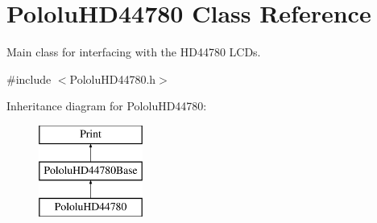 \hypertarget{class_pololu_h_d44780}{}\section{Pololu\+H\+D44780 Class Reference}
\label{class_pololu_h_d44780}


Main class for interfacing with the H\+D44780 L\+C\+Ds.  




{\ttfamily \#include $<$Pololu\+H\+D44780.\+h$>$}

Inheritance diagram for Pololu\+H\+D44780\+:\begin{figure}[H]
\begin{center}
\leavevmode
\includegraphics[height=3.000000cm]{class_pololu_h_d44780}
\end{center}
\end{figure}
